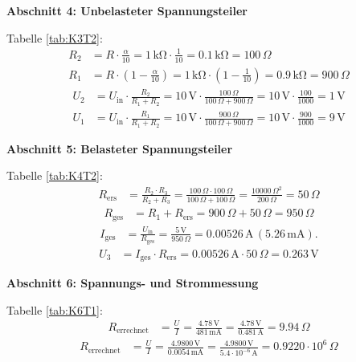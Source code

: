 \large \textbf{Abschnitt 4: Unbelasteter Spannungsteiler}

Tabelle \ref{tab:K3T2}:
\begin{align*}
    R_2 &= R \cdot \frac{\alpha}{10} = 1 \, \mathrm{k\Omega} \cdot \frac{1}{10} = 0.1 \, \mathrm{k\Omega} = 100 \, \Omega \\
    R_1 &= R \cdot \left( 1 - \frac{\alpha}{10} \right) = 1 \, \mathrm{k\Omega} \cdot \left( 1 - \frac{1}{10} \right) = 0.9 \, \mathrm{k\Omega} = 900 \, \Omega
\end{align*}
\begin{align*}
    U_2 &= U_{\text{in}} \cdot \frac{R_2}{R_1 + R_2} = 10 \, \mathrm{V} \cdot \frac{100 \, \Omega}{100 \, \Omega + 900 \, \Omega} = 10 \, \mathrm{V} \cdot \frac{100}{1000} = 1 \, \mathrm{V} \\
    U_1 &= U_{\text{in}} \cdot \frac{R_1}{R_1 + R_2} = 10 \, \mathrm{V} \cdot \frac{900 \, \Omega}{100 \, \Omega + 900 \, \Omega} = 10 \, \mathrm{V} \cdot \frac{900}{1000} = 9 \, \mathrm{V}
\end{align*}

\large \textbf{Abschnitt 5: Belasteter Spannungsteiler}

Tabelle \ref{tab:K4T2}:
\begin{align*}
    R_{\text{ers}} &= \frac{R_2 \cdot R_3}{R_2 + R_3} 
    = \frac{100 \, \Omega \cdot 100 \, \Omega}{100 \, \Omega + 100 \, \Omega} 
    = \frac{10000 \, \Omega^2}{200 \, \Omega} 
    = 50 \, \Omega
\end{align*}
\begin{align*}
    R_{\text{ges}} &= R_1 + R_{\text{ers}} 
    = 900 \, \Omega + 50 \, \Omega 
    = 950 \, \Omega
\end{align*}
\begin{align*}
    I_{\text{ges}} &= \frac{U_{\text{in}}}{R_{\text{ges}}} 
    = \frac{5 \, \mathrm{V}}{950 \, \Omega} 
    = 0.00526 \, \mathrm{A} \, (5.26 \, \mathrm{mA}).
\end{align*}
\begin{align*}
    U_3 &= I_{\text{ges}} \cdot R_{\text{ers}} 
    = 0.00526 \, \mathrm{A} \cdot 50 \, \Omega 
    = 0.263 \, \mathrm{V}
\end{align*}

\vspace{4cm}

\large \textbf{Abschnitt 6: Spannungs- und Strommessung}

Tabelle \ref{tab:K6T1}:
\begin{align*}
    R_{\text{errechnet}} &= \frac{U}{I} = \frac{4.78 \, \mathrm{V}}{481 \, \mathrm{mA}} = \frac{4.78 \, \mathrm{V}}{0.481 \, \mathrm{A}} = 9.94 \, \Omega
\end{align*}
\begin{align*}
    R_{\text{errechnet}} &= \frac{U}{I} = \frac{4.9800 \, \mathrm{V}}{0.0054 \, \mathrm{mA}} = \frac{4.9800 \, \mathrm{V}}{5.4 \cdot 10^{-6} \, \mathrm{A}} = 0.9220 \cdot 10^6 \, \Omega
\end{align*}

